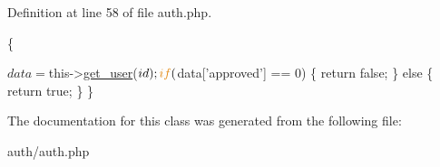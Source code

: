 Definition at line 58 of file auth.\-php.


\begin{DoxyCode}
                                         \{

        $data = $this->\hyperlink{classauth_aebf5c1995f3314883dc475628db61ccc}{get\_user}($id);
        \textcolor{keywordflow}{if} ($data[\textcolor{stringliteral}{'approved'}] == 0) \{
            \textcolor{keywordflow}{return} \textcolor{keyword}{false};
        \} \textcolor{keywordflow}{else} \{
            \textcolor{keywordflow}{return} \textcolor{keyword}{true};
        \}
    \}
\end{DoxyCode}


The documentation for this class was generated from the following file\-:\begin{DoxyCompactItemize}
\item 
auth/auth.\-php\end{DoxyCompactItemize}
